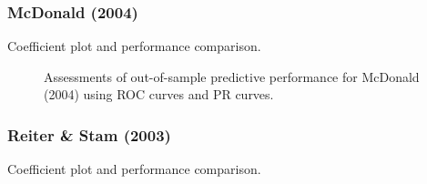 \clearpage
\subsubsection*{McDonald (2004)}

Coefficient plot and performance comparison.


\FloatBarrier

\begin{figure}
	\centering   
	\caption{Assessments of out-of-sample predictive performance for McDonald (2004) using ROC curves and PR curves.}
\end{figure}
\FloatBarrier

\clearpage
\subsubsection*{Reiter \& Stam (2003)}

Coefficient plot and performance comparison.


\FloatBarrier

